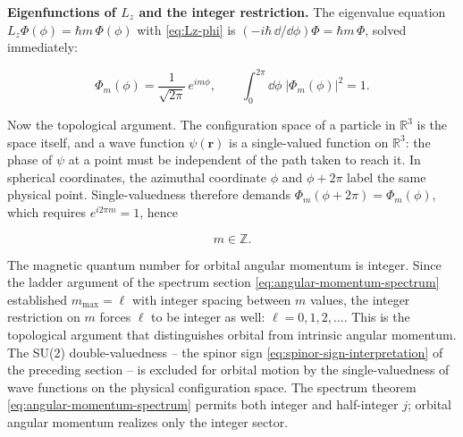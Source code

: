 \medskip\noindent\textbf{Eigenfunctions of $L_z$ and the integer restriction.}
The eigenvalue equation $L_z\Phi(\phi) = \hbar m\,\Phi(\phi)$ with \eqref{eq:Lz-phi} is $(-i\hbar\,\dd/\dd\phi)\Phi = \hbar m\,\Phi$, solved immediately:
\begin{linenomath}
  \begin{equation}
    \Phi_m(\phi) = \frac{1}{\sqrt{2\pi}}\,e^{im\phi},
    \qquad
    \int_0^{2\pi}\!\dd\phi\;|\Phi_m(\phi)|^2 = 1.
  \end{equation}
\end{linenomath}
Now the topological argument. The configuration space of a particle in $\mathbb{R}^3$ is the space itself, and a wave function $\psi(\bm r)$ is a single-valued function on $\mathbb{R}^3$: the phase of $\psi$ at a point must be independent of the path taken to reach it. In spherical coordinates, the azimuthal coordinate $\phi$ and $\phi + 2\pi$ label the same physical point. Single-valuedness therefore demands $\Phi_m(\phi + 2\pi) = \Phi_m(\phi)$, which requires $e^{i2\pi m} = 1$, hence
\begin{linenomath}
  \begin{equation}
    m \in \mathbb{Z}.
  \end{equation}
\end{linenomath}
The magnetic quantum number for orbital angular momentum is integer. Since the ladder argument of the spectrum section \eqref{eq:angular-momentum-spectrum} established $m_{\max} = \ell$ with integer spacing between $m$ values, the integer restriction on $m$ forces $\ell$ to be integer as well: $\ell = 0,1,2,\ldots$. This is the topological argument that distinguishes orbital from intrinsic angular momentum. The SU(2) double-valuedness -- the spinor sign \eqref{eq:spinor-sign-interpretation} of the preceding section -- is excluded for orbital motion by the single-valuedness of wave functions on the physical configuration space. The spectrum theorem \eqref{eq:angular-momentum-spectrum} permits both integer and half-integer $j$; orbital angular momentum realizes only the integer sector.

